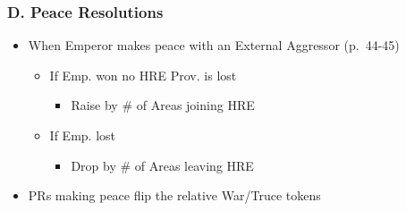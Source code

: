 \documentclass[10pt]{article}
\begin{document}
\subsubsection*{D. Peace Resolutions}
\begin{itemize}
	\item When Emperor makes peace with an External Aggressor (p.~44-45)
	\begin{itemize}
		\item If Emp. won  no HRE Prov. is lost
		\begin{itemize}
			\item Raise \authority by \# of Areas joining HRE
		\end{itemize}
		\item If Emp. lost
		\begin{itemize}
			\item Drop \authority by \# of Areas leaving HRE
		\end{itemize}
	\end{itemize}
	\item PRs making peace flip the relative War/Truce tokens
\end{itemize}
\end{document}
